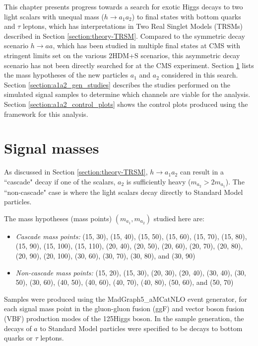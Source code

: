 This chapter presents progress towards a search for exotic Higgs decays to two light scalars with unequal mass ($h \rightarrow a_1 a_2$) to final states with bottom quarks and $\tau$ leptons, which has interpretations in Two Real Singlet Models (TRSMs) described in Section \ref{section:theory-TRSM}.  Compared to the symmetric decay scenario $h\rightarrow aa$, which has been studied in multiple final states at CMS with stringent limits set on the various 2HDM+S scenarios, this asymmetric decay scenario has not been directly searched for at the CMS experiment. Section \ref{section:a1a2_masses} lists the mass hypotheses of the new particles $a_1$ and $a_2$ considered in this search. Section \ref{section:a1a2_gen_studies} describes the studies performed on the simulated signal samples to determine which channels are viable for the analysis. Section \ref{section:a1a2_control_plots} shows the control plots produced using the framework for this analysis.

\section{Signal masses}
\label{section:a1a2_masses}
As discussed in Section \ref{section:theory-TRSM}, $h \rightarrow a_1 a_2$ can result in a ``cascade" decay if one of the scalars, $a_2$ is sufficiently heavy ($m_{a_2} > 2m_{a_1}$). The ``non-cascade" case is where the light scalars decay directly to Standard Model particles. 

The mass hypotheses (mass points) $(m_{a_1}, m_{a_2})$ studied here are:
\begin{itemize}
    \item \textit{Cascade mass points:} (15, 30), (15, 40), (15, 50), (15, 60), (15, 70), (15, 80), (15, 90), (15, 100), (15, 110), (20, 40), (20, 50), (20, 60), (20, 70), (20, 80), (20, 90), (20, 100), (30, 60), (30, 70), (30, 80), and (30, 90)\GeV
    \item \textit{Non-cascade mass points:} (15, 20), (15, 30), (20, 30), (20, 40), (30, 40), (30, 50), (30, 60), (40, 50), (40, 60), (40, 70), (40, 80), (50, 60), and (50, 70)\GeV
\end{itemize}
Samples were produced using the MadGraph5\_aMCatNLO event generator, for each signal mass point in the gluon-gluon fusion (ggF) and vector boson fusion (VBF) production modes of the 125\GeV Higgs boson. In the sample generation, the decays of $a$ to Standard Model particles were specified to be decays to bottom quarks or $\tau$ leptons.


